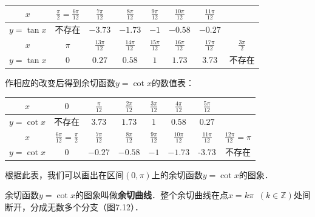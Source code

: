 \begin{center}
\begin{tabular}{c|ccccccc}
\hline
$x$  &    $\frac{\pi}{2}=\frac{6\pi}{12}$  &    $\frac{7\pi}{12}$  &    $\frac{8\pi}{12}$  &    $\frac{9\pi}{12}$  &    $\frac{10\pi}{12}$  &    $\frac{11\pi}{12}$  \\    
\hline
$y=\tan x$   & 不存在  & $-3.73$  & $-1.73$  & $-1$  & $-0.58$  & $-0.27$  \\
\hline
$x$  &    $\pi$  &    $\frac{13\pi}{12}$  &    $\frac{14\pi}{12}$  &    $\frac{15\pi}{12}$  &    $\frac{16\pi}{12}$  &    $\frac{17\pi}{12}$ & $\frac{3\pi}{2}$ \\    
\hline
$y=\tan x$   & 0  & $0.27$  & $0.58$  & $1$  & $1.73$ & 3.73 & 不存在  \\
\hline
\end{tabular}    
\end{center}

作相应的改变后得到余切函数$y=\cot x$的数值表：
\begin{center}
\begin{tabular}{c|ccccccc}
\hline
$x$  &    $0$  &    $\frac{\pi}{12}$  &    $\frac{2\pi}{12}$  &    $\frac{3\pi}{12}$  &    $\frac{4\pi}{12}$  &    $\frac{5\pi}{12}$  \\    
\hline
$y=\cot x$   & 不存在  & $3.73$  & $1.73$  & $1$  & $0.58$  & $0.27$  \\
\hline
$x$  &    $\frac{6\pi}{12}=\frac{\pi}{2}$  &    $\frac{7\pi}{12}$  &    $\frac{8\pi}{12}$  &    $\frac{9\pi}{12}$  &    $\frac{10\pi}{12}$  &    $\frac{11\pi}{12}$ & $\frac{12\pi}{12}=\pi$ \\    
\hline
$y=\cot x$   & 0  & $-0.27$  & $-0.58$  & $-1$  & $-1.73$ & -3.73 & 不存在  \\
\hline
\end{tabular}    
\end{center}

根据此表，我们可以画出在区间$(0,\pi)$上的余切函数$y=\cot x$的图象．

余切函数$y=\cot x$的图象叫做\textbf{余切曲线}．整个余切曲线在点$x=k\pi\;\;(k\in\mathbb{Z})$处间断开，分成无数多个分支（图7.12）．

\begin{figure}[htp]
    \centering
{}
    \caption{}
\end{figure}

